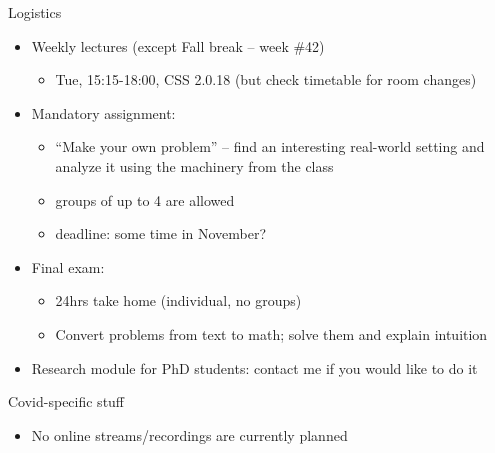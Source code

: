 \documentclass[english,10pt
,aspectratio=169
]{beamer}
\begin{document}
\begin{frame}{Logistics}
\begin{itemize}
	\item Weekly lectures (except Fall break -- week \#42)
	\begin{itemize}
		\item Tue, 15:15-18:00, CSS 2.0.18 (but check timetable for room changes)
	\end{itemize}
	
	\pause
	\item Mandatory assignment:
	\begin{itemize}
		\item ``Make your own problem'' -- find an interesting real-world setting and analyze it using the machinery from the class
		\item groups of up to 4 are allowed
		\item deadline: some time in November?
	\end{itemize}
	
	\pause
	\item Final exam:
	\begin{itemize}
		\item 24hrs take home (individual, no groups)
		\item Convert problems from text to math; solve them and explain intuition
	\end{itemize}

	\pause
	\item Research module for PhD students: contact me if you would like to do it
\end{itemize}
\end{frame}


\begin{frame}{Covid-specific stuff}
	\begin{itemize}
		\item No online streams/recordings are currently planned
	\end{itemize}
\end{frame}
\end{document}

